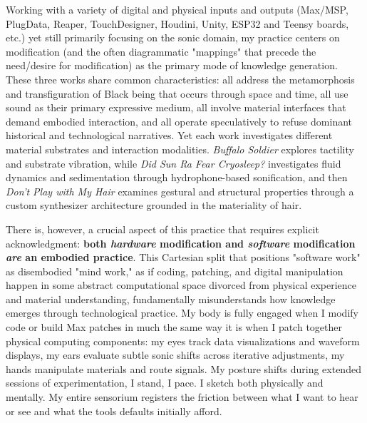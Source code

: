 Working with a variety of digital and physical inputs and outputs (Max/MSP, PlugData, Reaper, TouchDesigner, Houdini, Unity,  ESP32 and Teensy boards, etc.) yet still primarily focusing on the sonic domain, my practice centers on modification (and the often diagrammatic "mappings" that precede the need/desire for modification) as the primary mode of knowledge generation. These three works share common characteristics: all address the metamorphosis and transfiguration of Black being that occurs through space and time, all use sound as their primary expressive medium, all involve material interfaces that demand embodied interaction, and all operate speculatively to refuse dominant historical and technological narratives. Yet each work investigates different material substrates and interaction modalities. \emph{Buffalo Soldier} explores tactility and substrate vibration, while \emph{Did Sun Ra Fear Cryosleep?} investigates fluid dynamics and sedimentation through hydrophone-based sonification, and then \emph{Don't Play with My Hair} examines gestural and structural properties through a custom synthesizer architecture grounded in the materiality of hair.

There is, however, a crucial aspect of this practice that requires explicit acknowledgment: \textbf{both \textit{hardware} modification and \textit{software} modification \textit{are} an embodied practice}. This Cartesian split that positions "software work" as disembodied "mind work," as if coding, patching, and digital manipulation happen in some abstract computational space divorced from physical experience and material understanding, fundamentally misunderstands how knowledge emerges through technological practice. My body is fully engaged when I modify code or build Max patches in much the same way it is when I patch together physical computing components: my eyes track data visualizations and waveform displays, my ears evaluate subtle sonic shifts across iterative adjustments, my hands manipulate materials and route signals. My posture shifts during extended sessions of experimentation, I stand, I pace. I sketch both physically and mentally. My entire sensorium registers the friction between what I want to hear or see and what the tools defaults initially afford. 

